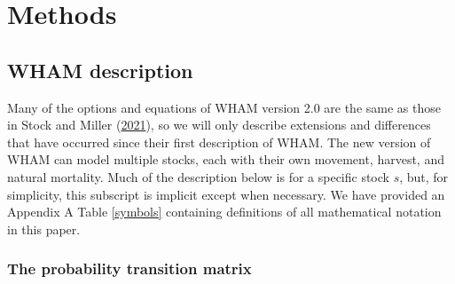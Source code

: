 \documentclass[
]{article}
\begin{document}
\hypertarget{methods}{%
\section*{Methods}\label{methods}}

\hypertarget{wham-description}{%
\subsection*{WHAM description}\label{wham-description}}

Many of the options and equations of WHAM version 2.0 are the same as those in Stock and Miller (\protect\hyperlink{ref-stockmiller21}{2021}), so we will only describe extensions and differences that have occurred since their first description of WHAM. The new version of WHAM can model multiple stocks, each with their own movement, harvest, and natural mortality. Much of the description below is for a specific stock \(s\), but, for simplicity, this subscript is implicit except when necessary. We have provided an Appendix A Table \ref{symbols} containing definitions of all mathematical notation in this paper.

\hypertarget{the-probability-transition-matrix}{%
\subsubsection*{The probability transition matrix}\label{the-probability-transition-matrix}}
\end{document}
